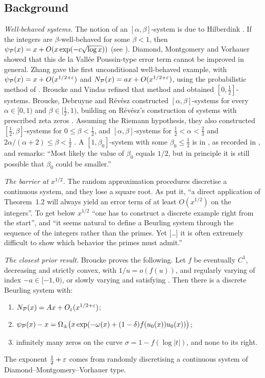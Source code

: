 \subsection{Background}
\emph{Well-behaved systems.} The notion of an $[\alpha,\beta]$-system is due to Hilberdink \cite{Hilberdink2005}. If the integers
are $\beta$-well-behaved for some $\beta<1$, then $\psi_{\mathcal{P}}(x)=x+O(x\exp(-c\sqrt{\log x}))$ (see \cite[\S1]{BDR}). Diamond, Montgomery and Vorhauer
\cite{DMV2006} showed that this de la Vall\'ee Poussin-type error term cannot be improved in general. Zhang \cite{Zhang2007} gave
the first unconditional well-behaved example, with $\psi_{\mathcal{P}}(x)=x+O(x^{1/2+\varepsilon})$ and $N_{\mathcal{P}}(x)=ax+O(x^{1/2+\varepsilon})$, using the
probabilistic method of \cite{DMV2006}. Broucke and Vindas \cite{BrouckeVindas2024} refined that method and obtained
$[0,\tfrac12]$-systems. Broucke, Debruyne and R\'ev\'esz \cite{BDR} constructed $[\alpha,\beta]$-systems for every
$\alpha\in[0,1)$ and $\beta\in[\tfrac12,1)$, building on R\'ev\'esz's construction of systems with prescribed zeta zeros
\cite{Revesz2023}. Assuming the Riemann hypothesis, they also constructed $[\tfrac12,\beta]$-systems for $0\le\beta<\tfrac12$, and
$[\alpha,\beta]$-systems for $\tfrac12<\alpha<\tfrac23$ and $2\alpha/(\alpha+2)\le\beta<\tfrac12$ \cite[Thm.~1.3]{BDR}. A
$[1,\beta_0]$-system with some $\beta_0\le\tfrac12$ is in \cite[Ch.~17]{DiamondZhang2016}, as recorded in \cite[p.~3]{BDR}, and
\cite[footnote~4]{BDR} remarks:
``Most likely the value of $\beta_0$ equals $1/2$, but in principle it is still possible that $\beta_0$ could be smaller.''

\emph{The barrier at $x^{1/2}$.} The random approximation procedures discretise a continuous system, and they lose a square
root. As \cite[\S5]{BDR} put it, ``a direct application of Theorem~1.2 will always yield an error term of at least $O(x^{1/2})$
on the integers''. To get below $x^{1/2}$ ``one has to construct a discrete example right from the start'', and ``it seems
natural to define a Beurling system through the sequence of the integers rather than the primes. Yet [\ldots] it is often
extremely difficult to show which behavior the primes must admit.''

\emph{The closest prior result.} Broucke \cite[Thm.~1.6]{Broucke2025} proves the following. Let $f$ be eventually $C^1$,
decreasing and strictly convex, with $1/u=o(f(u))$, and regularly varying of index $-a\in[-1,0)$, or slowly varying and
satisfying \cite[(1.10)]{Broucke2025}. Then there is a discrete Beurling system with:
\begin{enumerate}[label=(\arabic*)]
\item $N_{\mathcal{P}}(x)=Ax+O_\varepsilon(x^{1/2+\varepsilon})$;
\item $\psi_{\mathcal{P}}(x)-x=\Omega_\pm\bigl(x\exp(-\omega(x)+(1-\delta)f(u_0(x))u_0(x))\bigr)$;
\item infinitely many zeros on the curve $\sigma=1-f(\log|t|)$, and none to its right.
\end{enumerate}
The exponent $\tfrac12+\varepsilon$ comes from randomly discretising a continuous system of Diamond--\allowbreak Montgomery--\allowbreak Vorhauer type.

